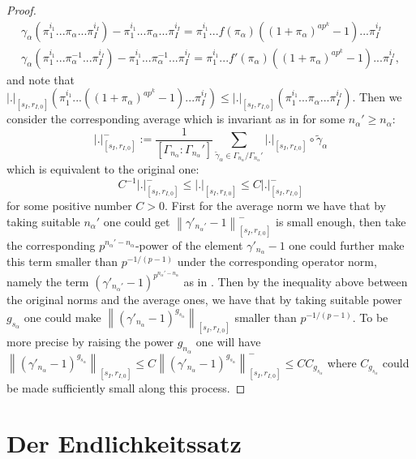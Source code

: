 \documentclass[12pt]{amsart}
\theoremstyle{definition}
\numberwithin{equation}{section}
\begin{document}
\begin{proof}
\begin{align}
\gamma_\alpha(\pi^{i_1}_1...\pi_\alpha...\pi^{i_I}_I)-\pi^{i_1}_1...\pi_\alpha...\pi^{i_I}_I=\pi^{i_1}_1...f(\pi_\alpha)((1+\pi_\alpha)^{ap^k}-1)...\pi^{i_I}_I\\
\gamma_\alpha(\pi^{i_1}_1...\pi^{-1}_\alpha...\pi^{i_I}_I)-\pi^{i_1}_1...\pi_\alpha^{-1}...\pi^{i_I}_I=\pi^{i_1}_1...f'(\pi_\alpha)((1+\pi_\alpha)^{ap^k}-1)...\pi^{i_I}_I,	
\end{align}
and note that $|.|_{[s_I,r_{I,0}]}(\pi^{i_1}_1...((1+\pi_\alpha)^{ap^k}-1)...\pi^{i_I}_I)\leq |.|_{[s_I,r_{I,0}]}(\pi^{i_1}_1...\pi_\alpha...\pi^{i_I}_I)$. Then we consider the corresponding average which is invariant as in \cite[Proposition 2.2.14]{KPX} for some $n_\alpha'\geq n_\alpha$:
\begin{displaymath}
|.|^{-}_{[s_I,r_{I,0}]}:=\frac{1}{[\Gamma_{n_\alpha}:\Gamma_{n_\alpha}']}\sum_{\widetilde{\gamma}_\alpha\in \Gamma_{n_\alpha}/\Gamma_{n_\alpha}'}|.|_{[s_I,r_{I,0}]}\circ \widetilde{\gamma}_\alpha	
\end{displaymath}
which is equivalent to the original one:
\begin{displaymath}
C^{-1}|.|^{-}_{[s_I,r_{I,0}]}\leq |.|_{[s_I,r_{I,0}]} \leq C|.|^{-}_{[s_I,r_{I,0}]}	
\end{displaymath}
for some positive number $C>0$. First for the average norm we have that by taking suitable $n_\alpha'$ one could get $\left\|\gamma'_{n_\alpha'}-1\right\|^{-}_{[s_I,r_{I,0}]}$ is small enough, then take the corresponding $p^{n_\alpha'-n_\alpha}$-power of the element $\gamma'_{n_\alpha}-1$ one could further make this term smaller than $p^{-1/(p-1)}$ under the corresponding operator norm, namely the term $(\gamma'_{n_\alpha'}-1)^{p^{n_\alpha'-n_\alpha}}$ as in \cite[Proposition 2.2.14]{KPX}. Then by the inequality above between the original norms and the average ones, we have that by taking suitable power $g_{s_\alpha}$ one could make $\left\|(\gamma'_{n_\alpha}-1)^{g_{s_\alpha}}\right\|_{[s_I,r_{I,0}]}$ smaller than $p^{-1/(p-1)}$. To be more precise by raising the power $g_{n_\alpha}$ one will have $\left\|(\gamma'_{n_\alpha}-1)^{g_{s_\alpha}}\right\|_{[s_I,r_{I,0}]}\leq C\left\|(\gamma'_{n_\alpha}-1)^{g_{s_\alpha}}\right\|_{[s_I,r_{I,0}]}^{-}\leq CC_{g_{s_\alpha}}$ where $C_{g_{s_\alpha}}$ could be made sufficiently small along this process.
\end{proof}




\newpage


\section{Der Endlichkeitssatz}
\end{document}
